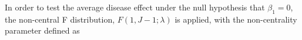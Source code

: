 In order to test the average disease effect under the null hypothesis that $\beta_{1} = 0$, the non-central F distribution,  $F(1,J-1; \lambda)$ \cite{Raudenbush2000} is applied, with the non-centrality parameter defined as